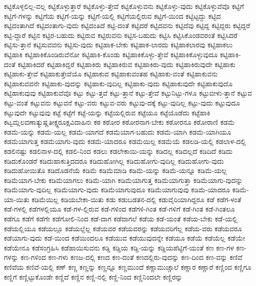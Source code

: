 {ಕಟ್ಟಿಕೊಳ್ಳಲಿಲ್ಲ-ವಲ್ಲ
ಕಟ್ಟಿಕೊಳ್ಳುತ್ತಾರೆ
ಕಟ್ಟಿಕೊಳ್ಳು-ತ್ತೇವೆ
ಕಟ್ಟಿಕೊಳ್ಳುವನು
ಕಟ್ಟಿಕೊಳ್ಳು-ವುದು
ಕಟ್ಟಿಕೊಳ್ಳುವೆವೊ
ಕಟ್ಟಿಗೆ
ಕಟ್ಟಿಗೆ-ಗಳನ್ನು
ಕಟ್ಟಿಗೆಯ
ಕಟ್ಟಿಗೆ-ಯನ್ನು
ಕಟ್ಟಿಗೆ-ಯಲ್ಲಿ
ಕಟ್ಟಿಗೆಯಲ್ಲಿರುವ
ಕಟ್ಟಿಗೆ-ಯಿಂದ
ಕಟ್ಟಿಟ್ಟದ್ದು
ಕಟ್ಟಿದ
ಕಟ್ಟಿದಂತಾಗಿದೆ
ಕಟ್ಟಿದಂತಾಗು-ವುದು
ಕಟ್ಟಿದಂತಿದೆ
ಕಟ್ಟಿ-ದಂತೆ
ಕಟ್ಟಿದರೆ
ಕಟ್ಟಿದವನು
ಕಟ್ಟಿದೆವು
ಕಟ್ಟಿದ್ದ
ಕಟ್ಟಿದ್ದರು
ಕಟ್ಟಿದ್ದರೆ
ಕಟ್ಟಿ-ದ್ದಾರೆ
ಕಟ್ಟಿನ
ಕಟ್ಟಿರ-ಬಹುದು
ಕಟ್ಟಿರುವ
ಕಟ್ಟಿರುವನು
ಕಟ್ಟಿಸ-ಬಹುದು
ಕಟ್ಟಿಸಿ
ಕಟ್ಟಿಸಿಕೊಂಡವರಂತೆ
ಕಟ್ಟಿಸಿದರೆ
ಕಟ್ಟಿಸು-ತ್ತಾನೆ
ಕಟ್ಟಿಸುವವನು
ಕಟ್ಟಿಸು-ವುದು
ಕಟ್ಟಿಹಾಕ-ಬೇಕು
ಕಟ್ಟಿಹಾಕ-ಲಾರದು
ಕಟ್ಟಿಹಾಕಲಾರವು
ಕಟ್ಟಿಹಾಕಲು
ಕಟ್ಟಿಹಾಕಿ
ಕಟ್ಟಿಹಾಕಿಕೊಂಡಿರುವೆನೋ
ಕಟ್ಟಿಹಾಕಿ-ಕೊಂಡು
ಕಟ್ಟಿಹಾಕಿಕೊಳ್ಳು-ತ್ತೇವೆ
ಕಟ್ಟಿಹಾಕಿಕೊಳ್ಳುವುದೂ
ಕಟ್ಟಿಹಾಕಿ-ದಂತೆ
ಕಟ್ಟಿಹಾಕಿದರೆ
ಕಟ್ಟಿಹಾಕಿದ್ದರೆ
ಕಟ್ಟಿಹಾಕಿರು
ಕಟ್ಟಿಹಾಕಿರುವ
ಕಟ್ಟಿಹಾಕಿರು-ವುದು
ಕಟ್ಟಿಹಾಕಿರುವುದೇ
ಕಟ್ಟಿಹಾಕು
ಕಟ್ಟಿಹಾಕು-ತ್ತೇವೆ
ಕಟ್ಟಿಹಾಕುತ್ತೇವೆಯೊ
ಕಟ್ಟಿಹಾಕುವ
ಕಟ್ಟಿಹಾಕುವಂತಹ
ಕಟ್ಟಿಹಾಕು-ವಂತೆ
ಕಟ್ಟಿಹಾಕುವನು
ಕಟ್ಟಿಹಾಕುವವನೇ
ಕಟ್ಟಿಹಾಕು-ವುದನ್ನು
ಕಟ್ಟಿಹಾಕು-ವುದಿಲ್ಲ
ಕಟ್ಟಿಹಾಕು-ವುದು
ಕಟ್ಟಿಹಾಕುವುದೇ
ಕಟ್ಟಿಹಾಕುವುದೊ
ಕಟ್ಟಿಹಾಕುವುವು
ಕಟ್ಟಿಹಾಕುವೆವೊ
ಕಟ್ಟು
ಕಟ್ಟು-ತ್ತವೆ
ಕಟ್ಟು-ತ್ತಾನೆ
ಕಟ್ಟು-ತ್ತೇವೆ
ಕಟ್ಟುನಿಟ್ಟು-ಗಳೂ
ಕಟ್ಟುಬೀಳು-ತ್ತಾನೆ
ಕಟ್ಟುವ
ಕಟ್ಟು-ವಂತೆ
ಕಟ್ಟುವನು
ಕಟ್ಟುವನೆ
ಕಟ್ಟು-ವರು
ಕಟ್ಟುವ-ವರು
ಕಟ್ಟುವು-ದಕ್ಕೆ
ಕಟ್ಟು-ವುದಿಲ್ಲ
ಕಟ್ಟು-ವುದು
ಕಟ್ಟುವುದೂ
ಕಟ್ಟುವುದೇ
ಕಟ್ಟುವುವು
ಕಟ್ಟೆ
ಕಟ್ಟೆಗೆ
ಕಟ್ಟೆ-ಯನ್ನು
ಕಟ್ಟೆಯಲ್ಲಿರುವ
ಕಟ್ಟೆಯೂ
ಕಟ್ಟೆಯೊಡೆದು
ಕಟ್ಟೆಹಾಕಿ
ಕಟ್ವಮ್ಲಲವಣಾತ್ಯುಷ್ಣತೀಕ್ಷ್ಣರೂಕ್ಷವಿದಾಹಿನಃ
ಕಠ
ಕಠೋರ
ಕಠೋರನಾಗ-ಬೇಕು
ಕಠೋರನೂ
ಕಠೋರಾಣಿ
ಕಡಮೆ
ಕಡಮೆ-ಯನ್ನು
ಕಡಮೆ-ಯಲ್ಲ
ಕಡಮೆ-ಯಾಗದೆ
ಕಡಮೆಯಾಗ-ಬಹುದು
ಕಡಮೆ-ಯಾಗಿ
ಕಡಮೆ-ಯಾಗಿಯೂ
ಕಡಮೆಯಾಗುತ್ತ
ಕಡಮೆಯಾಗು-ವುದು
ಕಡಮೆ-ಯಾದರೂ
ಕಡಮೆಯಿಲ್ಲ
ಕಡಮೆಯೆ
ಕಡಲಡಿ-ಯಲ್ಲಿ
ಕಡಲಾಳ-ದಲ್ಲಿ
ಕಡಲಿನಷ್ಟು
ಕಡಲಿನಾಳ-ದಲ್ಲಿ
ಕಡಲಿ-ನಿಂದ
ಕಡಲು
ಕಡಲೇಕಾಯಿ-ಯನ್ನು
ಕಡಿದಲ್ಲ
ಕಡಿದಲ್ಲದೆ
ಕಡಿದಿದೆ
ಕಡಿದು
ಕಡಿದುಕೊಂಡರೆ
ಕಡಿದುಹಾಕುತ್ತಿದದರೂ
ಕಡಿದುಹೋಗಿಲ್ಲ
ಕಡಿದುಹೋಗು-ವುದಿಲ್ಲ
ಕಡಿದುಹೋಗು-ವುದು
ಕಡಿದುಹೋಯಿತೊ
ಕಡಿದೊಡನೆಯೆ
ಕಡಿಮೆ
ಕಡಿಮೆಮಾಡಿ
ಕಡಿಮೆ-ಯನ್ನು
ಕಡಿಮೆ-ಯನ್ನೂ
ಕಡಿಮೆ-ಯಲ್ಲ
ಕಡಿಮೆಯಾಗ-ಬೇಕು
ಕಡಿಮೆಯಾಗಲು
ಕಡಿಮೆ-ಯಾಗಿ
ಕಡಿಮೆಯಾಗುತ್ತ
ಕಡಿಮೆಯಾಗುತ್ತಾ
ಕಡಿಮೆಯಾಗು-ವುದನ್ನು
ಕಡಿಮೆಯಾಗು-ವುದಿಲ್ಲ
ಕಡಿಮೆಯಾಗು-ವುದು
ಕಡಿಮೆಯಾಗುವುದೂ
ಕಡಿಮೆಯಾಗುವುವು
ಕಡಿಮೆ-ಯಾದರೂ
ಕಡಿಮೆ-ಯಾ-ಯಿತು
ಕಡಿಮೆಯಿಲ್ಲ
ಕಡಿಯಬೇಕಾ-ಯಿತು
ಕಡು
ಕಡುಬಡತನ-ದಲ್ಲಿ
ಕಡುವೈರಿಯಾಗಿದ್ದರೂ
ಕಡೆ
ಕಡೆಗ-ಳಂತೆ
ಕಡೆ-ಗಳಲ್ಲಿ
ಕಡೆಗಳಲ್ಲಿಯೂ
ಕಡೆ-ಗಳ-ಲ್ಲಿರುವ
ಕಡೆ-ಗಳಿಂದ
ಕಡೆಗಳಿ-ಗಿಂತ
ಕಡೆ-ಗಳಿಗೆ
ಕಡೆ-ಗಿಂತ
ಕಡೆ-ಗಿಂತಲೂ
ಕಡೆಗೂ
ಕಡೆಗೆ
ಕಡೆಗೇ
ಕಡೆಗೋಲಿ-ನಿಂದ
ಕಡೆ-ದಾಗ
ಕಡೆದಾಗಲೆ
ಕಡೆಯ
ಕಡೆ-ಯಂತೆ
ಕಡೆಯ-ಬೇಕು
ಕಡೆ-ಯಲ್ಲಿ
ಕಡೆಯಲ್ಲಿಯೂ
ಕಡೆಯಲ್ಲೂ
ಕಡೆಯಲ್ಲೆಲ್ಲ
ಕಡೆಯವರ
ಕಡೆಯವರನ್ನು
ಕಡೆಯವರಿಗೆಲ್ಲ
ಕಡೆಯ-ವರು
ಕಡೆಯವರೂ
ಕಡೆಯಾಗು-ವುದು
ಕಡೆ-ಯಿಂದ
ಕಡೆಯಿಂದಲೂ
ಕಡೆಯುವ
ಕಡೆಯುವುದನ್ನೇ
ಕಡೆಯೂ
ಕಡೆಯೆ
ಕಡೆಯೆಲ್ಲ
ಕಡೆಯೇ
ಕಡೆಯೇನೂ
ಕಡೆಸಂಗ್ರಹಿಸಿ
ಕಡೆಹಾಯಿಸುವನು
ಕಡ್ಡಿ
ಕಡ್ಡಿಯ
ಕಡ್ಡಿ-ಯನ್ನು
ಕಡ್ಡಿಯಪೆಟ್ಟಿಗೆ-ಯಂತೆ
ಕಣ
ಕಣ-ಗಳ
ಕಣ-ಗಳನ್ನು
ಕಣ-ಗಳಿಂದ
ಕಣ-ಗಳು
ಕಣಜ-ದಲ್ಲಿ
ಕಣದ
ಕಣ-ದಂತೆ
ಕಣದಲ್ಲಿರು-ವುದನ್ನು
ಕಣ-ದಿಂದ
ಕಣ-ವನ್ನು
ಕಣಿವೆ
ಕಣಿವೆಯ
ಕಣಿವೆ-ಯಲ್ಲಿ
ಕಣ್
ಕಣ್ಣ
ಕಣ್ಣನ್ನು
ಕಣ್ಣನ್ನೂ
ಕಣ್ಣಮುಂದೆ
ಕಣ್ಣಾಮುಚ್ಚಾಲೆ
ಕಣ್ಣಾರ
ಕಣ್ಣಾರೆ
ಕಣ್ಣಿಂದ
ಕಣ್ಣಿಗೂ
ಕಣ್ಣಿಗೆ
ಕಣ್ಣಿಟ್ಟುಕೊಂಡೇ
ಕಣ್ಣಿದೆ
ಕಣ್ಣಿನ
ಕಣ್ಣಿ-ನಲ್ಲಿ
ಕಣ್ಣಿ-ನಿಂದ
ಕಣ್ಣಿನಿಂದಲೇ
ಕಣ್ಣಿರನ್ನು
}
